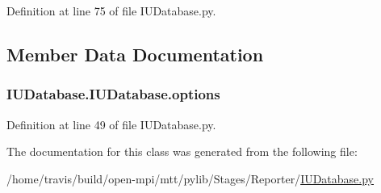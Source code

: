Definition at line 75 of file I\-U\-Database.\-py.



\subsection{Member Data Documentation}
\hypertarget{classIUDatabase_1_1IUDatabase_a87c602469e1908c2c79859691839e9de}{
\subsubsection[{options}]{\setlength{\rightskip}{0pt plus 5cm}I\-U\-Database.\-I\-U\-Database.\-options}}\label{classIUDatabase_1_1IUDatabase_a87c602469e1908c2c79859691839e9de}


Definition at line 49 of file I\-U\-Database.\-py.



The documentation for this class was generated from the following file\-:\begin{DoxyCompactItemize}
\item 
/home/travis/build/open-\/mpi/mtt/pylib/\-Stages/\-Reporter/\hyperlink{IUDatabase_8py}{I\-U\-Database.\-py}\end{DoxyCompactItemize}
